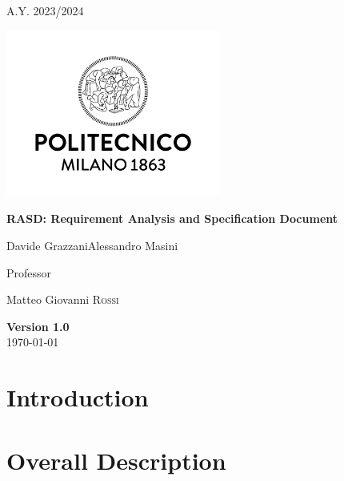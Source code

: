 \documentclass[table, 12pt]{article}
\begin{document}
    
    \begin{titlepage}
        \centering
        {\scshape\large A.Y. 2023/2024 \par}
        \vfill
        \includegraphics[width=200pt]{assets/logo_polimi}\par\vspace{1cm}
        \vspace{0.5cm}
        {\huge\bfseries RASD\@: Requirement Analysis
            and Specification Document \par}
        \vspace{1cm}
        {\large {Davide Grazzani\quad Alessandro Masini}\par}
        \vfill
        {\large Professor\par
            Matteo Giovanni \textsc{Rossi}}
        \vfill
        {\large \textbf{Version 1.0}\\ \today \par}
    \end{titlepage}
    
    \thispagestyle{plain}

    \mbox{}

    \newpage
    \tableofcontents

    \newpage

    \section{Introduction}
        
        \newpage

    \section{Overall Description}
        
        \newpage
\end{document}
